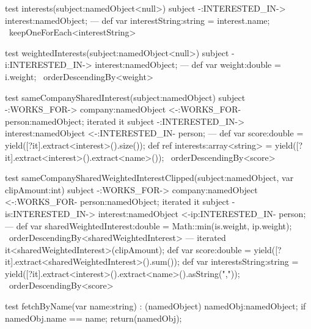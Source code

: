 \begin{example}

  \begin{grgen}
test interests(subject:namedObject<null>)
{
	subject -:INTERESTED_IN-> interest:namedObject;
---
	def var interestString:string = interest.name;
} \ keepOneForEach<interestString>

test weightedInterests(subject:namedObject<null>)
{
	subject -i:INTERESTED_IN-> interest:namedObject;
---
	def var weight:double = i.weight;
} \ orderDescendingBy<weight>

test sameCompanySharedInterest(subject:namedObject)
{
	subject -:WORKS_FOR-> company:namedObject <-:WORKS_FOR- person:namedObject;
	iterated it {
		subject -:INTERESTED_IN-> interest:namedObject <-:INTERESTED_IN- person;
	}
---
	def var score:double = yield([?it].extract<interest>().size());
	def ref interests:array<string> = yield([?it].extract<interest>().extract<name>());
} \ orderDescendingBy<score>

test sameCompanySharedWeightedInterestClipped(subject:namedObject, var clipAmount:int)
{
	subject -:WORKS_FOR-> company:namedObject <-:WORKS_FOR- person:namedObject;
	iterated it {
		subject -is:INTERESTED_IN-> interest:namedObject <-ip:INTERESTED_IN- person;
	---
		def var sharedWeightedInterest:double = Math::min(is.weight, ip.weight);
	} \ orderDescendingBy<sharedWeightedInterest>
---
	iterated it\orderDescendingBy<sharedWeightedInterest>\keepFirst(clipAmount);
	def var score:double = yield([?it].extract<sharedWeightedInterest>().sum());
	def var interestsString:string = yield([?it].extract<interest>().extract<name>().asString(","));
} \ orderDescendingBy<score>

test fetchByName(var name:string) : (namedObject)
{
	namedObj:namedObject;
	if{ namedObj.name == name; }
	return(namedObj);
}
  \end{grgen}\label{exsimplequeryrules}

\end{example}


